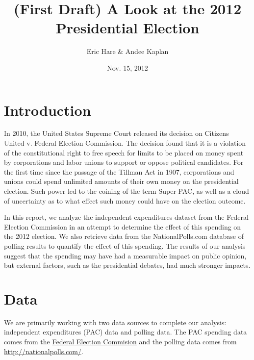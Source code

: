 \documentclass[11pt]{article}\usepackage{graphicx, color}
\begin{document}
\title{(First Draft) A Look at the 2012 Presidential Election}
\author{Eric Hare \& Andee Kaplan}
\date{Nov. 15, 2012}

\maketitle

\section{Introduction}
In 2010, the United States Supreme Court released its decision on Citizens United v. Federal Election Commission.  The decision found that it is a violation of the constitutional right to free speech for limits to be placed on money spent by corporations and labor unions to support or oppose political candidates.  For the first time since the passage of the Tillman Act in 1907, corporations and unions could spend unlimited amounts of their own money on the presidential election.  Such power led to the coining of the term Super PAC, as well as a cloud of uncertainty as to what effect such money could have on the election outcome.

In this report, we analyze the independent expenditures dataset from the Federal Election Commission in an attempt to determine the effect of this spending on the 2012 election.  We also retrieve data from the NationalPolls.com database of polling results to quantify the effect of this spending.  The results of our analysis suggest that the spending may have had a measurable impact on public opinion, but external factors, such as the presidential debates, had much stronger impacts.


\section{Data}
We are primarily working with two data sources to complete our analysis: independent expenditures (PAC) data and polling data. The PAC spending data comes from the \href{http://www.fec.gov/data/IndependentExpenditure.do?format=html&cf=superPAC}{Federal Election Commision} and the polling data comes from \url{http://nationalpolls.com/}. 
\end{document}
